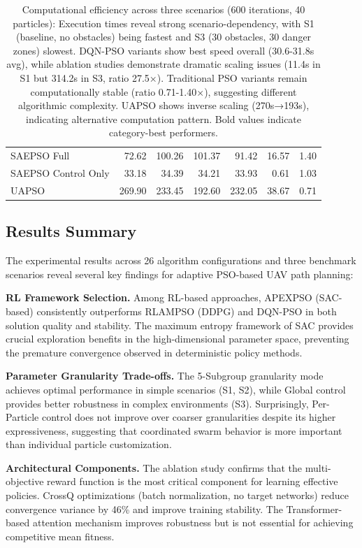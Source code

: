 \documentclass[fleqn,10pt]{wlscirep}
\begin{document}
\begin{table}[H]
{\begin{tabular}{lrrrrrr}
SAEPSO Full & 72.62 & 100.26 & 101.37 & 91.42 & 16.57 & 1.40 \\
SAEPSO Control Only & 33.18 & 34.39 & 34.21 & 33.93 & 0.61 & 1.03 \\
UAPSO & 269.90 & 233.45 & 192.60 & 232.05 & 38.67 & 0.71 \\
\hline
\end{tabular}%
}
\caption{Computational efficiency across three scenarios (600 iterations, 40 particles): Execution times reveal strong scenario-dependency, with S1 (baseline, no obstacles) being fastest and S3 (30 obstacles, 30 danger zones) slowest. DQN-PSO variants show best speed overall (30.6-31.8s avg), while ablation studies demonstrate dramatic scaling issues (11.4s in S1 but 314.2s in S3, ratio 27.5×). Traditional PSO variants remain computationally stable (ratio 0.71-1.40×), suggesting different algorithmic complexity. UAPSO shows inverse scaling (270s→193s), indicating alternative computation pattern. Bold values indicate category-best performers.}
\label{tab:computational_efficiency}
\end{table}

\subsection*{Results Summary}

The experimental results across 26 algorithm configurations and three benchmark scenarios reveal several key findings for adaptive PSO-based UAV path planning:

\textbf{RL Framework Selection.} Among RL-based approaches, APEXPSO (SAC-based) consistently outperforms RLAMPSO (DDPG) and DQN-PSO in both solution quality and stability.
The maximum entropy framework of SAC provides crucial exploration benefits in the high-dimensional parameter space, preventing the premature convergence observed in deterministic policy methods.

\textbf{Parameter Granularity Trade-offs.} The 5-Subgroup granularity mode achieves optimal performance in simple scenarios (S1, S2), while Global control provides better robustness in complex environments (S3).
Surprisingly, Per-Particle control does not improve over coarser granularities despite its higher expressiveness, suggesting that coordinated swarm behavior is more important than individual particle customization.

\textbf{Architectural Components.} The ablation study confirms that the multi-objective reward function is the most critical component for learning effective policies.
CrossQ optimizations (batch normalization, no target networks) reduce convergence variance by 46\% and improve training stability.
The Transformer-based attention mechanism improves robustness but is not essential for achieving competitive mean fitness.
\end{document}
